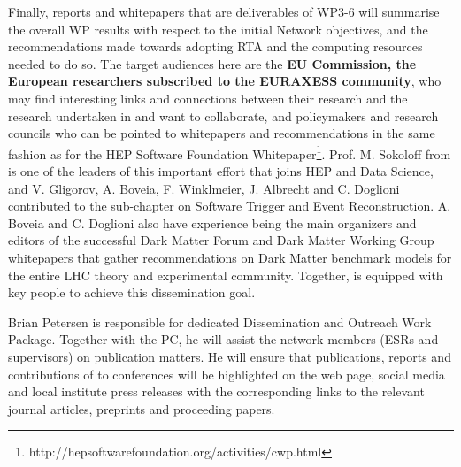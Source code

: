 Finally, reports and whitepapers that are deliverables of WP3-6
will summarise the overall WP results with respect to the initial Network objectives,
and the recommendations
made towards adopting RTA and the computing resources needed to do so. 
The target audiences here are the \textbf{EU Commission, the European researchers subscribed to the 
EURAXESS community}, who may find interesting links and connections between
their research and the research undertaken in \acronym and want to collaborate, and policymakers
and research councils who can be pointed to whitepapers and recommendations in the 
same fashion as for the HEP Software Foundation Whitepaper\footnote{http://hepsoftwarefoundation.org/activities/cwp.html}. Prof. M. Sokoloff from \cincinnatientity is one of the leaders of this important effort
that joins HEP and Data Science, and V. Gligorov, A. Boveia,
F. Winklmeier, J. Albrecht and C. Doglioni contributed to the sub-chapter on Software Trigger and Event Reconstruction. A. Boveia and C. Doglioni also have experience being the main organizers and editors of the successful Dark Matter Forum and Dark Matter Working Group whitepapers that gather recommendations on Dark Matter benchmark models for the entire LHC theory and experimental community. Together, \acronym is equipped with  key people to achieve this dissemination goal. 

Brian Petersen is responsible for dedicated Dissemination
and Outreach Work Package. Together with the PC, 
he will assist the network members (ESRs and supervisors) on
publication matters. He will ensure that publications, reports and contributions of
\acronym to conferences will be highlighted on the \acronym web page, social media 
and local institute press releases with the corresponding links to the relevant journal articles, 
preprints and proceeding papers.
